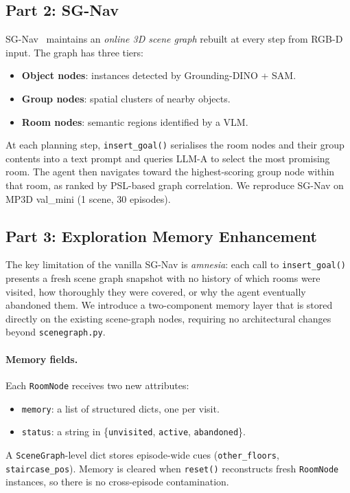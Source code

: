 \documentclass[10pt,twocolumn,letterpaper]{article}
\begin{document}
\subsection{Part 2: SG-Nav}

SG-Nav~\cite{yin2024sgnav} maintains an \emph{online 3D scene graph}
rebuilt at every step from RGB-D input.
The graph has three tiers:
\begin{itemize}[leftmargin=1em]
  \item \textbf{Object nodes}: instances detected by Grounding-DINO + SAM.
  \item \textbf{Group nodes}: spatial clusters of nearby objects.
  \item \textbf{Room nodes}: semantic regions identified by a VLM.
\end{itemize}
At each planning step, \texttt{insert\_goal()} serialises the room nodes
and their group contents into a text prompt and queries LLM-A to select the
most promising room.
The agent then navigates toward the highest-scoring group node within that
room, as ranked by PSL-based graph correlation.
We reproduce SG-Nav on MP3D val\_mini (1 scene, 30 episodes).

\subsection{Part 3: Exploration Memory Enhancement}
\label{sec:memory_method}

The key limitation of the vanilla SG-Nav is \emph{amnesia}: each call to
\texttt{insert\_goal()} presents a fresh scene graph snapshot with no
history of which rooms were visited, how thoroughly they were covered, or
why the agent eventually abandoned them.
We introduce a two-component memory layer that is stored directly on the
existing scene-graph nodes, requiring no architectural changes beyond
\texttt{scenegraph.py}.

\paragraph{Memory fields.}
Each \texttt{RoomNode} receives two new attributes:
\begin{itemize}[leftmargin=1em]
  \item \texttt{memory}: a list of structured dicts, one per visit.
  \item \texttt{status}: a string in
        \{\texttt{unvisited}, \texttt{active}, \texttt{abandoned}\}.
\end{itemize}
A \texttt{SceneGraph}-level dict stores episode-wide cues
(\texttt{other\_floors}, \texttt{staircase\_pos}).
Memory is cleared when \texttt{reset()} reconstructs fresh
\texttt{RoomNode} instances, so there is no cross-episode contamination.
\end{document}
